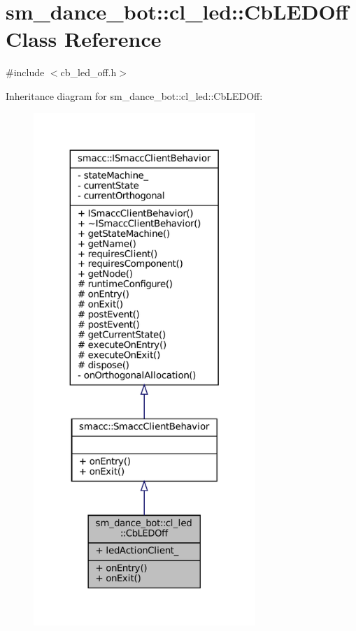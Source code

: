 \hypertarget{classsm__dance__bot_1_1cl__led_1_1CbLEDOff}{}\section{sm\+\_\+dance\+\_\+bot\+:\+:cl\+\_\+led\+:\+:Cb\+L\+E\+D\+Off Class Reference}
\label{classsm__dance__bot_1_1cl__led_1_1CbLEDOff}


{\ttfamily \#include $<$cb\+\_\+led\+\_\+off.\+h$>$}



Inheritance diagram for sm\+\_\+dance\+\_\+bot\+:\+:cl\+\_\+led\+:\+:Cb\+L\+E\+D\+Off\+:
\nopagebreak
\begin{figure}[H]
\begin{center}
\leavevmode
\includegraphics[height=550pt]{classsm__dance__bot_1_1cl__led_1_1CbLEDOff__inherit__graph}
\end{center}
\end{figure}


